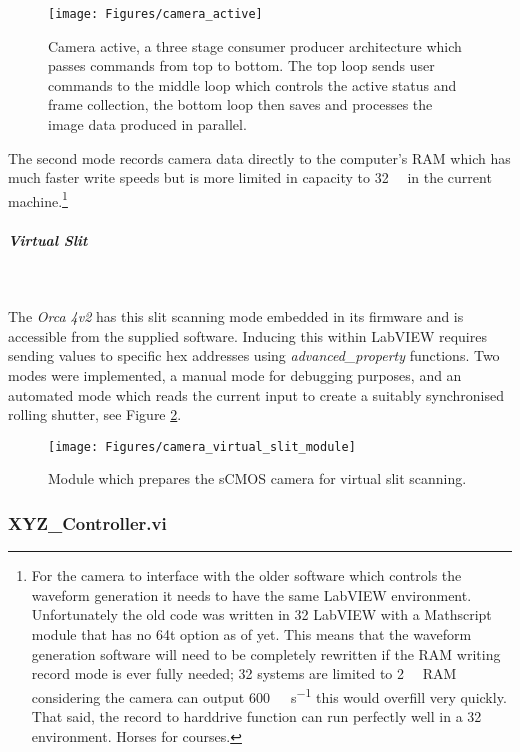 \documentclass[10pt,a4paper]{report}
\begin{document}
\begin{spacing}{1.5}
\begin{figure}
	\centering
	\texttt{[image: Figures/camera\_active]}
	\caption[Camera active state]{Camera active, a three stage consumer producer architecture which passes commands from top to bottom. The top loop sends user commands to the middle loop which controls the active status and frame collection, the bottom loop then saves and processes the image data produced in parallel.}
	\label{fig:camera_active}
\end{figure}

The second mode records camera data directly to the computer's RAM which has much faster write speeds but is more limited in capacity to \SI{32}{\giga\byte} in the current machine.\footnote{For the camera to interface with the older software which controls the waveform generation it needs to have the same LabVIEW environment. Unfortunately the old code was written in \SI{32}{\bit} LabVIEW with a Mathscript module that has no \SI{64}{\bit}t option as of yet. This means that the waveform generation software will need to be completely rewritten if the RAM writing record mode is ever fully needed; \SI{32}{\bit} systems are limited to \SI{2}{\giga\byte} RAM considering the camera can output \SI{600}{\mega\byte\per\second} this would overfill very quickly. That said, the record to harddrive function can run perfectly well in a \SI{32}{\bit} environment. Horses for courses.}


\subparagraph{Virtual Slit}~

The \textit{Orca 4v2} has this slit scanning mode embedded in its firmware and is accessible from the supplied software. Inducing this within LabVIEW requires sending values to specific hex addresses using \textit{advanced\_property} functions. Two modes were implemented, a manual mode for debugging purposes, and an automated mode which reads the current input to create a suitably synchronised rolling shutter, see Figure \ref{fig:camera_virtual_slit_module}.

\begin{figure}
\centering
\texttt{[image: Figures/camera\_virtual\_slit\_module]}
\caption[LabVIEW virtual slit scanning module]{Module which prepares the sCMOS camera for virtual slit scanning.}
\label{fig:camera_virtual_slit_module}
\end{figure}

\subsubsection{XYZ\_Controller.vi}


\end{spacing}
\end{document}
